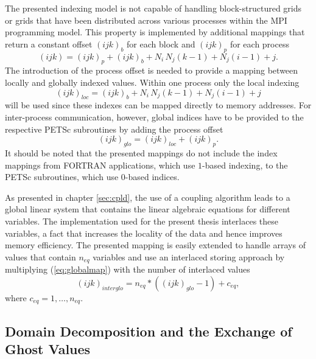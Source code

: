The presented indexing model is not capable of handling block-structured grids or grids that have been distributed across various processes within the MPI programming model. This property is implemented by additional mappings that return a constant offset \((ijk)_b\) for each block and \((ijk)_p\) for each process
\begin{displaymath}
  (ijk) = (ijk)_p + (ijk)_b +  N_i \, N_j \left(k - 1\right) + N_j \left(i - 1\right) + j.
\end{displaymath}
The introduction of the process offset is needed to provide a mapping between locally and globally indexed values. Within one process only the local indexing 
\begin{displaymath}
  (ijk)_{loc} = (ijk)_b +  N_i \, N_j \left(k - 1\right) + N_j \left(i - 1\right) + j
\end{displaymath}
will be used since these indexes can be mapped directly to memory addresses. For inter-process communication, however, global indices have to be provided to the respective PETSc subroutines by adding the process offset
\begin{equation}
  \label{eq:globalmap}
  (ijk)_{glo} = (ijk)_{loc} + (ijk)_p.
\end{equation}
It should be noted that the presented mappings do not include the index mappings from FORTRAN applications, which use \(1\)-based indexing, to the PETSc subroutines, which use \(0\)-based indices.

As presented in chapter \ref{sec:cpld}, the use of a coupling algorithm leads to a global linear system that contains the linear algebraic equations for different variables. The implementation used for the present thesis interlaces these variables, a fact that increases the locality of the data and hence improves memory efficiency. The presented mapping is easily extended to handle arrays of values that contain \(n_{eq}\) variables and use an interlaced storing approach by multiplying (\ref{eq:globalmap}) with the number of interlaced values
\begin{displaymath}
  (ijk)_{interglo} = n_{eq} * \left( (ijk)_{glo}  - 1 \right) + c_{eq},
\end{displaymath}
where \(c_{eq} = 1,\dots,n_{eq} \).

\subsection{Domain Decomposition and the Exchange of Ghost Values}

